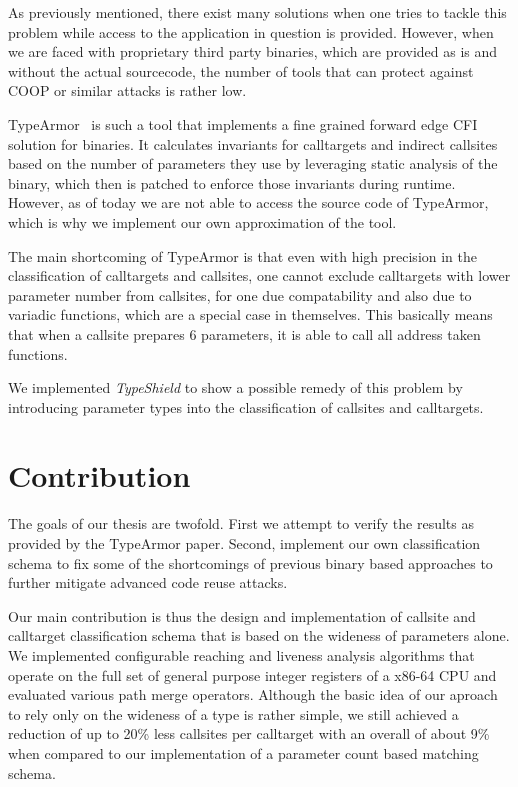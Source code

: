 As previously mentioned, there exist many solutions when one tries to tackle this problem while access to the application in question is provided. However, when we are faced with proprietary third party binaries, which are provided as is and without the actual sourcecode, the number of tools that can protect against COOP or similar attacks is rather low.

TypeArmor~\cite{veen:typearmor} is such a tool that implements a fine grained forward edge CFI solution for binaries. It calculates invariants for calltargets and indirect callsites based on the number of parameters they use by leveraging static analysis of the binary, which then is patched to enforce those invariants during runtime. However, as of today we are not able to access the source code of TypeArmor, which is why we implement our own approximation of the tool.

The main shortcoming of TypeArmor is that even with high precision in the classification of calltargets and callsites, one cannot exclude calltargets with lower parameter number from callsites, for one due compatability and also due to variadic functions, which are a special case in themselves. This basically means that when a callsite prepares 6 parameters, it is able to call all address taken functions.


We implemented \textit{TypeShield} to show a possible remedy of this problem by introducing parameter types into the classification of callsites and calltargets. 

\section{Contribution}
The goals of our thesis are twofold. First we attempt to verify the results as provided by the TypeArmor paper. Second, implement our own classification schema to fix some of the shortcomings of previous binary based approaches to further mitigate advanced code reuse attacks.

Our main contribution is thus the design and implementation of callsite and calltarget classification schema that is based on the wideness of parameters alone. We implemented configurable reaching and liveness analysis algorithms that operate on the full set of general purpose integer registers of a x86-64 CPU and evaluated various path merge operators. Although the basic idea of our aproach to rely only on the wideness of a type is rather simple, we still achieved a reduction of up to 20\% less callsites per calltarget with an overall of about 9\% when compared to our implementation of a parameter count based matching schema.


